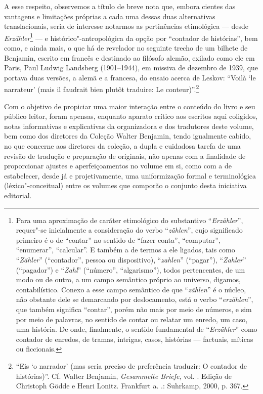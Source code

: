 A esse respeito, observemos a título de breve nota que, embora cientes
das vantagens e limitações próprias a cada uma dessas duas alternativas
translacionais, seria de interesse notarmos as pertinências etimológica
--- desde \emph{Erzähler}\footnote{Para uma aproximação de caráter
  etimológico do substantivo ``\emph{Erzähler}'', requer"-se inicialmente
  a consideração do verbo ``\emph{zählen}'', cujo significado primeiro é
  o de ``contar'' no sentido de ``fazer conta'', ``computar'',
  ``enumerar'', ``calcular''. E também a de termos a ele ligados, tais
  como ``\emph{Zähler}'' (``contador'', pessoa ou dispositivo),
  ``\emph{zahlen}'' (``pagar''), ``\emph{Zahler}'' (``pagador'') e
  ``\emph{Zahl}'' (``número'', ``algarismo''), todos pertencentes, de um
  modo ou de outro, a um campo semântico próprio ao universo, digamos,
  contabilístico. Conexo a esse campo semântico de que ``\emph{zählen}''
  é o núcleo, não obstante dele se demarcando por deslocamento, está o
  verbo ``\emph{erzählen}'', que também significa ``contar'', porém não
  mais por meio de números, e sim por meio de palavras, no sentido de
  contar ou relatar um enredo, um caso, uma história. De onde,
  finalmente, o sentido fundamental de ``\emph{Erzähler}'' como contador
  de enredos, de tramas, intrigas, casos, histórias --- factuais, míticas
  ou ficcionais.} --- e histórico"-antropológica da opção por ``contador
de histórias'', bem como, e ainda mais, o que há de revelador no
seguinte trecho de um bilhete de Benjamin, escrito em francês e
destinado ao filósofo alemão, exilado como ele em Paris, Paul Ludwig
Landsberg (1901--1944), em missiva de dezembro de 1939, que portava duas
versões, a alemã e a francesa, do ensaio acerca de Leskov: ``Voilà `le
narrateur' (mais il faudrait bien plutôt traduire: Le
conteur)''.\footnote{``Eis `o narrador' (mas seria preciso de
  preferência traduzir: O contador de histórias)''. Cf. Walter Benjamin,
  \emph{Gesammelte Briefe}, vol. . Edição de Christoph Gödde e Henri
  Lonitz. Frankfurt a. .: Suhrkamp, 2000, p. 367.}

Com o objetivo de propiciar uma maior interação entre o
conteúdo do livro e seu público leitor, foram apensas, enquanto
aparato crítico aos escritos aqui coligidos, notas informativas e
explicativas da organizadora e dos tradutores deste volume, bem como dos
diretores da Coleção Walter Benjamin, tendo igualmente cabido, no que
concerne aos diretores da coleção, a dupla e cuidadosa tarefa de uma
revisão de tradução e preparação de originais, não apenas com a
finalidade de proporcionar ajustes e aperfeiçoamentos no volume em si,
como com a de estabelecer, desde já e projetivamente, uma uniformização
formal e terminológica (léxico"-conceitual) entre os volumes que comporão
o conjunto desta iniciativa editorial.

